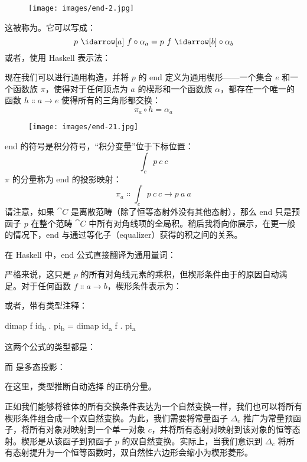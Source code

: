 \begin{figure}[H]
  \centering
  \texttt{[image: images/end-2.jpg]}
\end{figure}

\noindent
这被称为。它可以写成：
\[p\ \idarrow[a]\ f \circ \alpha_a = p\ f\ \idarrow[b] \circ \alpha_b\]
或者，使用 Haskell 表示法：

现在我们可以进行通用构造，并将 $p$ 的 end 定义为通用楔形——一个集合 $e$ 和一个函数族 $\pi$，使得对于任何顶点为 $a$ 的楔形和一个函数族 $\alpha$，都存在一个唯一的函数 $h \Colon a \to e$ 使得所有的三角形都交换：
\[\pi_a \circ h = \alpha_a\]

\begin{figure}[H]
  \centering
  \texttt{[image: images/end-21.jpg]}
\end{figure}

\noindent
end 的符号是积分符号，“积分变量”位于下标位置：
\[\int_c p\ c\ c\]
$\pi$ 的分量称为 end 的投影映射：
\[\pi_a \Colon \int_c p\ c\ c \to p\ a\ a\]
请注意，如果 $\cat{C}$ 是离散范畴（除了恒等态射外没有其他态射），那么 end 只是预函子 $p$ 在整个范畴 $\cat{C}$ 中所有对角线项的全局积。稍后我将向你展示，在更一般的情况下，end 与通过等化子（equalizer）获得的积之间的关系。

在 Haskell 中，end 公式直接翻译为通用量词：

严格来说，这只是 $p$ 的所有对角线元素的乘积，但楔形条件由于的原因自动满足。对于任何函数 $f \Colon a \to b$，楔形条件表示为：

或者，带有类型注释：

\begin{snipv}
  dimap f id\textsubscript{b} . pi\textsubscript{b} = dimap id\textsubscript{a} f . pi\textsubscript{a}
\end{snipv}
这两个公式的类型都是：

而  是多态投影：

在这里，类型推断自动选择  的正确分量。

正如我们能够将锥体的所有交换条件表达为一个自然变换一样，我们也可以将所有楔形条件组合成一个双自然变换。为此，我们需要将常量函子 $\Delta_c$ 推广为常量预函子，将所有对象对映射到一个单一对象 $c$，并将所有态射对映射到该对象的恒等态射。楔形是从该函子到预函子 $p$ 的双自然变换。实际上，当我们意识到 $\Delta_c$ 将所有态射提升为一个恒等函数时，双自然性六边形会缩小为楔形菱形。

